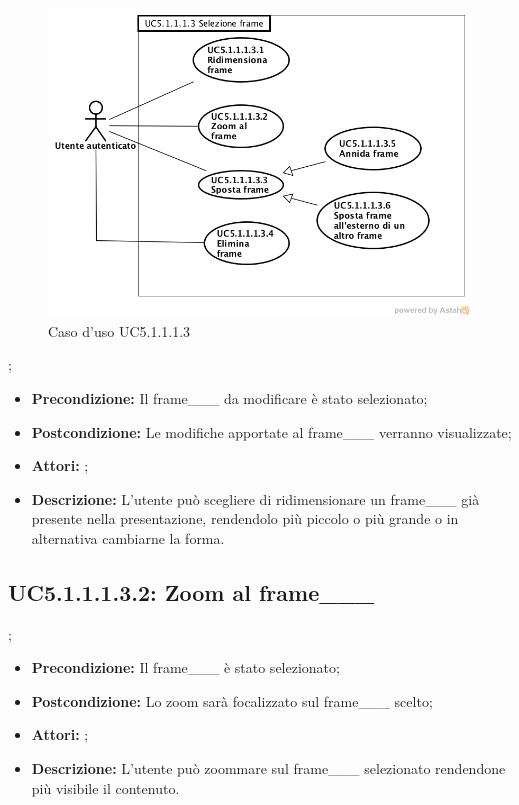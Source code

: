 \begin{figure}[h]
	\begin{center}
	\includegraphics[scale=0.4]{diagram/UC5-1-1-1-3.png}
	\caption{Caso d'uso UC5.1.1.1.3}
	\end{center}
\end{figure};
\begin{itemize}
	\item \textbf{Precondizione:} Il frame___ da modificare è stato selezionato;
	\item \textbf{Postcondizione:} Le modifiche apportate al frame___ verranno visualizzate;
	\item \textbf{Attori:} ;
	\item \textbf{Descrizione:} L'utente può scegliere di ridimensionare un frame___ già presente nella presentazione, rendendolo più piccolo o più grande o in alternativa cambiarne la forma.
\end{itemize}
\subsection{ UC5.1.1.1.3.2: Zoom al frame___}
;
\begin{itemize}
	\item \textbf{Precondizione:} Il frame___ è stato selezionato;
	\item \textbf{Postcondizione:} Lo zoom sarà focalizzato sul frame___ scelto;
	\item \textbf{Attori:} ;
	\item \textbf{Descrizione:} L'utente può zoommare sul frame___ selezionato rendendone più visibile il contenuto.
\end{itemize}
